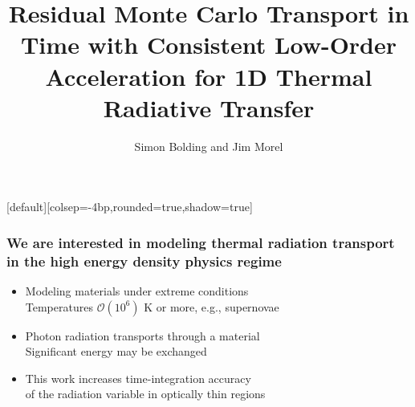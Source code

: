 \documentclass[xcolor=dvipsnames,hyperref={pdfpagelabels=false},unknownkeysallowed]{beamer}
\title[HOLO for TRT]{Residual Monte Carlo Transport in Time with Consistent Low-Order Acceleration for 1D Thermal Radiative Transfer}
\author[S.R. Bolding]{{Simon Bolding and  Jim Morel}}
\date{\vspace{-0.1in}{April 17 2017} }
\newcommand{\colb}[1]{{\color{blue} #1}}
\newcommand{\colG}[1]{{\color{Gray!110} #1}}
\newlength{\wideitemsep}
\let\olditem\item
\renewcommand{\item}{\setlength{\itemsep}{\wideitemsep}\olditem}
\begin{document}
[default][colsep=-4bp,rounded=true,shadow=true]

\def\beginpage{\null\vfill\bgroup
\offinterlineskip\leftskip=\z@}
\def\endpage{\egroup\eject}

\begin{frame}
    \titlepage \vspace{-0.213in}
    \begin{center}
    \end{center}    
\end{frame}

\setlength{\tabcolsep}{6pt}



\begin{frame}
\frametitle{We are interested in modeling thermal radiation transport \\ in the high energy
    density physics regime}
{\addtolength{\leftmargini}{-0.2in}
    \addtolength{\wideitemsep}{0.08in}
\begin{itemize}
    \item[] Modeling materials under extreme conditions \\ \colG{Temperatures $\mathcal{O}(10^6)$ K or more, e.g., supernovae}
    \item[] Photon radiation transports through a material \\ 
        \colG{Significant \colb{energy}  may be exchanged}
 \item[] This work increases time-integration accuracy \\ \colG{of the radiation variable in optically thin regions}
    \end{itemize}}
\end{frame}
\end{document}
